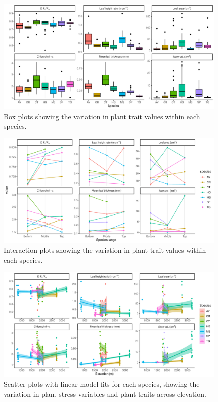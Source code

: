 \documentclass[a4paper, 11pt]{article}
\begin{document}
\begin{figure}[H]
\includegraphics[width=\textwidth]{box}
\centering
\caption{Box plots showing the variation in plant trait values within each species.}
\label{fig:box}
\end{figure}

\begin{figure}[H]
\includegraphics[width=\textwidth]{spaghetti}
\centering
\caption{Interaction plots showing the variation in plant trait values within each species.}
\label{fig:spaghetti}
\end{figure}


\begin{figure}[H]
\includegraphics[width=\textwidth]{traits_elev_scatter}
\centering
\caption{Scatter plots with linear model fits for each species, showing the variation in plant stress variables and plant traits across elevation.}
\label{fig:traits_elev_scatter}
\end{figure}
\end{document}
